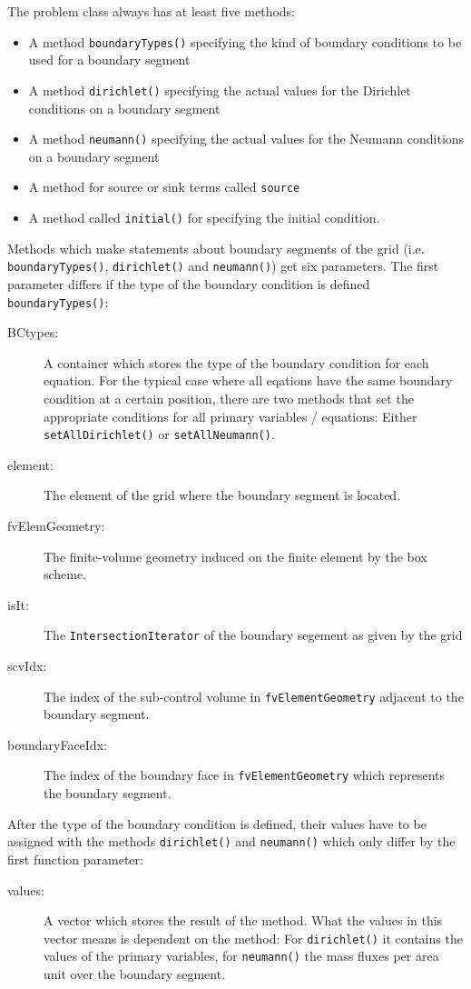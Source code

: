 The problem class always has at least five methods:
\begin{itemize}
\item A method \texttt{boundaryTypes()} specifying the kind of
  boundary conditions to be used for a boundary segment
\item A method \texttt{dirichlet()} specifying the actual values for
  the Dirichlet conditions on a boundary segment
\item A method \texttt{neumann()} specifying the actual values for
  the Neumann conditions on a boundary segment
\item A method for source or sink terms called \texttt{source}
\item A method called \texttt{initial()} for specifying the initial
  condition.
\end{itemize}

Methods which make statements about boundary segments of the grid (i.e. 
\texttt{boundaryTypes()}, \texttt{dirichlet()} and \texttt{neumann()}) get 
six parameters. The first parameter differs if the type of the boundary condition
is defined \texttt{boundaryTypes()}:
\begin{description}
\item[BCtypes:] A container which stores the type of the boundary condition
for each equation. For the typical case where all eqations have the same boundary
condition at a certain position, there are two methods that set the appropriate conditions
for all primary variables / equations: Either \texttt{setAllDirichlet()} or \texttt{setAllNeumann()}.
\item[element:] The element of the grid where the boundary segment
  is located.
\item[fvElemGeometry:] The finite-volume geometry induced on the
  finite element by the box scheme.
\item[isIt:] The \texttt{IntersectionIterator} of the boundary
  segement as given by the grid
\item[scvIdx:] The index of the sub-control volume in
  \texttt{fvElementGeometry} adjacent to the boundary segment.
\item[boundaryFaceIdx:] The index of the boundary face in
  \texttt{fvElementGeometry} which represents the boundary segment.  
\end{description}
After the type of the boundary condition is defined, their values have to be
assigned with the methods \texttt{dirichlet()} and \texttt{neumann()} which only differ 
by the first function parameter:
\begin{description}
 \item[values:] A vector which stores the result of the method. What
  the values in this vector means is dependent on the method: For
  \texttt{dirichlet()} it contains the values of the primary
  variables, for \texttt{neumann()} the mass fluxes per area unit
  over the boundary segment.
\end{description}

